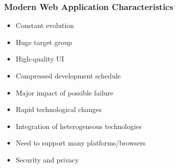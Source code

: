 \documentclass{beamer}
\begin{document}
\begin{frame}\frametitle{Modern Web Application Characteristics} 
  \begin{itemize}

    \item Constant evolution \pause
    
    \item Huge target group  \pause
    
    \item High-quality UI    \pause
    
    \item Compressed development schedule  \pause
    
    \item Major impact of possible failure \pause
    
    \item Rapid technological changes  \pause
    
    \item Integration of heterogeneous technologies  \pause
    
    \item Need to support many platforms/browsers   \pause
    
    \item Security and privacy
    
  \end{itemize}
\end{frame}
\end{document}
